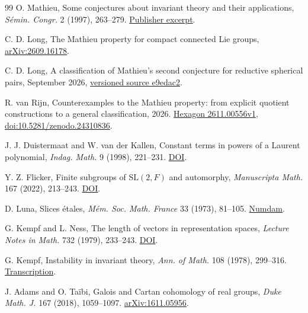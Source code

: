 \documentclass[11pt]{article}
\newcommand{\SL}{\mathrm{SL}}
\begin{document}
\begin{thebibliography}{99}
\small
\setlength{\itemsep}{2pt}
\setlength{\parsep}{0pt}
O. Mathieu, Some conjectures about invariant theory and their applications,
\emph{S\'emin. Congr.} 2 (1997), 263--279.
\href{https://smf.emath.fr/sites/default/files/2018-11/smf_sem-cong_2_263-279__sample.pdf}{Publisher excerpt}.

C. D. Long, The Mathieu property for compact connected Lie groups,
\href{https://arxiv.org/abs/2609.16178}{arXiv:2609.16178}.

C. D. Long, A classification of Mathieu's second conjecture for
reductive spherical pairs, September 2026,
\href{https://github.com/long-mathematics/mathieu-second-conjecture-spherical-pairs/blob/e9edac262b4b64eb68feb0e6e80496cefe4a1dee/mathieu_second_conjecture_spherical_pairs.tex}{versioned source e9edac2}.

R. van Rijn, Counterexamples to the Mathieu property: from explicit
quotient constructions to a general classification, 2026.
\href{https://hexagonmath.org/2611.00556v1}{Hexagon 2611.00556v1},
\href{https://doi.org/10.5281/zenodo.24310836}{doi:10.5281/zenodo.24310836}.

J. J. Duistermaat and W. van der Kallen, Constant terms in powers of
a Laurent polynomial, \emph{Indag. Math.} 9 (1998), 221--231.
\href{https://doi.org/10.1016/S0019-3577(98)80020-7}{DOI}.

Y. Z. Flicker, Finite subgroups of \(\SL(2,F)\) and automorphy,
\emph{Manuscripta Math.} 167 (2022), 213--243.
\href{https://doi.org/10.1007/s00229-021-01274-x}{DOI}.

D. Luna, Slices \'etales, \emph{M\'em. Soc. Math. France} 33 (1973),
81--105. \href{https://numdam.org/articles/10.24033/msmf.110/}{Numdam}.

G. Kempf and L. Ness, The length of vectors in representation spaces,
\emph{Lecture Notes in Math.} 732 (1979), 233--243.
\href{https://doi.org/10.1007/BFb0066647}{DOI}.

G. Kempf, Instability in invariant theory, \emph{Ann. of Math.}
108 (1978), 299--316. \href{https://arxiv.org/abs/1807.02890}{Transcription}.

J. Adams and O. Ta\"ibi, Galois and Cartan cohomology of real groups,
\emph{Duke Math. J.} 167 (2018), 1059--1097.
\href{https://arxiv.org/abs/1611.05956}{arXiv:1611.05956}.


\end{thebibliography}
\end{document}
